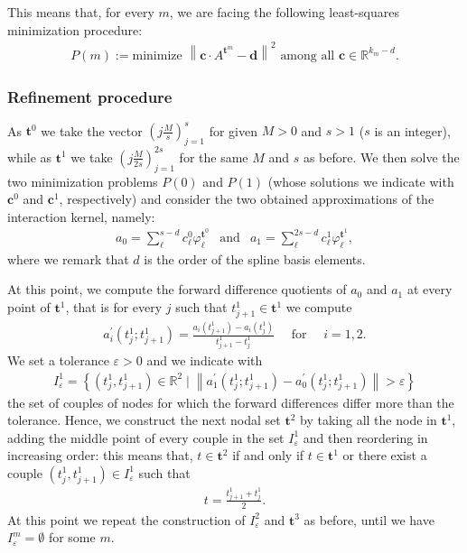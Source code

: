 \documentclass[A4paper,11pt]{article}
\theoremstyle{definition}
\newcommand{\vnorm}[1]{\left\| #1 \right\|}
\begin{document}
This means that, for every $m$, we are facing the following least-squares minimization procedure:
\begin{align*}
P(m) := \text{minimize } \vnorm{\mathbf{c} \cdot A^{\mathbf{t}^m} - \mathbf{d}}^2 \text{ among all } \mathbf{c} \in \mathbb{R}^{k_m - d}.
\end{align*}

\subsubsection{Refinement procedure}

As $\mathbf{t}^0$ we take the vector $\left(j \frac{M}{s}\right)_{j = 1}^{s}$ for given $M > 0$ and $s > 1$ ($s$ is an integer), while as $\mathbf{t}^1$ we take $\left(j \frac{M}{2s}\right)_{j = 1}^{2s}$ for the same $M$ and $s$ as before. We then solve the two minimization problems $P(0)$ and $P(1)$ (whose solutions we indicate with $\mathbf{c}^0$ and $\mathbf{c}^1$, respectively) and consider the two obtained approximations of the interaction kernel, namely:
\begin{eqnarray*}
a_0 = \sum^{s - d}_{\ell} c^0_{\ell} \varphi^{\mathbf{t}^0}_{\ell} & \text{and} & a_1 = \sum^{2s - d}_{\ell} c^1_{\ell} \varphi^{\mathbf{t}^1}_{\ell},
\end{eqnarray*}
where we remark that $d$ is the order of the spline basis elements.

At this point, we compute the forward difference quotients of $a_0$ and $a_1$ at every point of $\mathbf{t}^1$, that is for every $j$ such that $t^1_{j+1} \in \mathbf{t}^1$ we compute
\begin{align*}
a^{\prime}_i(t^1_j;t^1_{j+1}) = \frac{a_i(t^1_{j+1}) - a_i(t^1_j)}{t^1_{j+1} - t^1_j} \quad \text{ for } \quad i = 1,2.
\end{align*}
We set a tolerance $\varepsilon > 0$ and we indicate with
\begin{align*}
I^1_{\varepsilon} = \left\{ (t^1_j, t^1_{j+1}) \in \mathbb{R}^2 \mid \vnorm{a^{\prime}_1(t^1_j;t^1_{j+1}) - a^{\prime}_0(t^1_j;t^1_{j+1})} > \varepsilon \right\}
\end{align*}
the set of couples of nodes for which the forward differences differ more than the tolerance. Hence, we construct the next nodal set $\mathbf{t}^2$ by taking all the node in $\mathbf{t}^1$, adding the middle point of every couple in the set $I^1_{\varepsilon}$ and then reordering in increasing order: this means that, $t \in \mathbf{t}^2$ if and only if $t \in \mathbf{t}^1$ or there exist a couple $(t^1_j, t^1_{j+1}) \in I^1_{\varepsilon}$ such that
\begin{align*}
t = \frac{t^1_{j+1} + t^1_j}{2}.
\end{align*}
At this point we repeat the construction of $I^2_{\varepsilon}$ and $\mathbf{t}^3$ as before, until we have $I^m_{\varepsilon} = \emptyset$ for some $m$.
\end{document}
